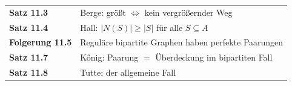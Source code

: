 \begin{merksatz}
\begin{center}
\renewcommand{\arraystretch}{1.5}
\begin{tabular}{@{}P{3.0cm}P{5.6cm}@{}}
\toprule
\textbf{Satz 11.3} & Berge: größt $\iff$ kein vergrößernder Weg\\
\textbf{Satz 11.4} & Hall: $|N(S)| \ge |S|$ für alle $S \subseteq A$\\
\textbf{Folgerung 11.5} & Reguläre bipartite Graphen haben perfekte Paarungen\\
\textbf{Satz 11.7} & Kőnig: Paarung $=$ Überdeckung im bipartiten Fall\\
\textbf{Satz 11.8} & Tutte: der allgemeine Fall\\
\bottomrule
\end{tabular}
\end{center}

\begin{center}
\begin{minipage}{0.88\textwidth}
\end{minipage}
\end{center}
\end{merksatz}
